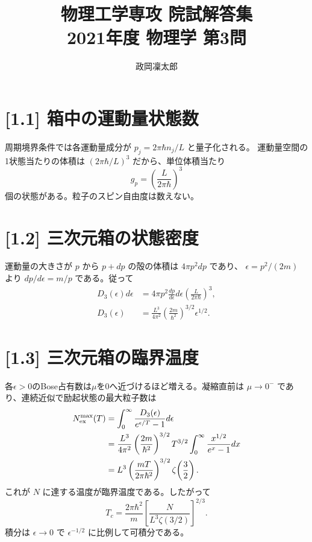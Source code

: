 \documentclass[11pt,a4paper]{article}
\title{物理工学専攻 院試解答集\\2021年度 物理学 第3問}
\author{政岡凜太郎}
\date{}
\begin{document}
\maketitle

\section*{[1.1] 箱中の運動量状態数}
周期境界条件では各運動量成分が $p_j=2\pi\hbar n_j/L$ と量子化される。
運動量空間の1状態当たりの体積は $(2\pi\hbar/L)^3$ だから、単位体積当たり
\begin{equation}
 \boxed{g_p=\left(\frac{L}{2\pi\hbar}\right)^3}
\end{equation}
個の状態がある。粒子のスピン自由度は数えない。

\section*{[1.2] 三次元箱の状態密度}
運動量の大きさが $p$ から $p+dp$ の殻の体積は $4\pi p^2dp$ であり、
$\epsilon=p^2/(2m)$ より $dp/d\epsilon=m/p$ である。従って
\begin{align}
 D_3(\epsilon)d\epsilon
 &=4\pi p^2\frac{dp}{d\epsilon}d\epsilon
   \left(\frac{L}{2\pi\hbar}\right)^3,\\
 D_3(\epsilon)
 &=\frac{L^3}{4\pi^2}
   \left(\frac{2m}{\hbar^2}\right)^{3/2}\epsilon^{1/2}.
 \label{eq:D3}
\end{align}

\section*{[1.3] 三次元箱の臨界温度}
各$\epsilon>0$のBose占有数は$\mu$を0へ近づけるほど増える。凝縮直前は $\mu\to0^-$ であり、連続近似で励起状態の最大粒子数は
\begin{align}
 N_{\rm ex}^{\max}(T)
 &=\int_0^\infty\frac{D_3(\epsilon)}{e^{\epsilon/T}-1}d\epsilon\\
 &=\frac{L^3}{4\pi^2}\left(\frac{2m}{\hbar^2}\right)^{3/2}
   T^{3/2}\int_0^\infty\frac{x^{1/2}}{e^x-1}dx\\
 &=L^3\left(\frac{mT}{2\pi\hbar^2}\right)^{3/2}\zeta\!\left(\frac32\right).
\end{align}
これが $N$ に達する温度が臨界温度である。したがって
\begin{equation}
 \boxed{T_c=\frac{2\pi\hbar^2}{m}
       \left[\frac{N}{L^3\zeta(3/2)}\right]^{2/3}}.
\end{equation}
積分は $\epsilon\to0$ で $\epsilon^{-1/2}$ に比例して可積分である。
\end{document}
